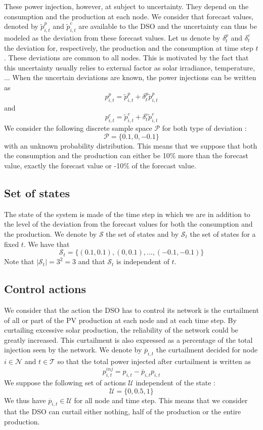 These power injection, however, at subject to uncertainty.
They depend on the consumption and the production at each node.
We consider that forecast values, denoted by $\tilde{p}_{i,t}^p$ and $\tilde{p}_{i,t}^c$ are available to the DSO and the uncertainty can thus be modeled as the deviation from these forecast values.
Let us denote by $\delta_t^p$ and $\delta_t^c$ the deviation for, respectively, the production and the consumption at time step $t$.
These deviations are common to all nodes.
This is motivated by the fact that this uncertainty usually relies to external factor as solar irradiance, temperature, ...
When the uncertain deviations are known, the power injections can be written as
$$ p_{i,t}^p = \tilde{p}_{i,t}^p + \delta_t^p\tilde{p}_{i,t}^p$$
and
$$ p_{i,t}^c = \tilde{p}_{i,t}^c + \delta_t^c\tilde{p}_{i,t}^c$$
We consider the following discrete sample space $\mathcal{P}$ for both type of deviation :
$$\mathcal{P} = \{0.1, 0, -0.1\}$$
with an unknown probability distribution.
This means that we suppose that both the consumption and the production can either be 10\% more than the forecast value, exactly the forecast value or -10\% of the forecast value.

\subsection{Set of states}

The state of the system is made of the time step in which we are in addition to the level of the deviation from the forecast values for both the consumption and the production.
We denote by $\mathcal{S}$ the set of states and by $\mathcal{S}_t$ the set of states for a fixed $t$.
We have that
$$\mathcal{S}_t = \{(0.1, 0.1), (0, 0.1), ..., (-0.1, -0.1)\}$$
Note that $|\mathcal{S}_t| = 3^2 = 3$ and that $\mathcal{S}_t$ is independent of $t$.

\subsection{Control actions}

We consider that the action the DSO has to control its network is the curtailment of all or part of the PV production at each node and at each time step.
By curtailing excessive solar production, the reliability of the network could be greatly increased.
This curtailment is also expressed as a percentage of the total injection seen by the network.
We denote by $\overline{p}_{i,t}$ the curtailment decided for node $i \in \mathcal{N}$ and $t \in \mathcal{T}$ so that the total power injected after curtailment is written as
$$p^{inj}_{i,t} = p_{i,t} - \overline{p}_{i,t}p_{i,t}$$
We suppose the following set of actions $\mathcal{U}$ independent of the state :
$$\mathcal{U} = \{0, 0.5, 1\}$$
We thus have $\overline{p}_{i,t} \in \mathcal{U}$ for all node and time step.
This means that we consider that the DSO can curtail either nothing, half of the production or the entire production.

